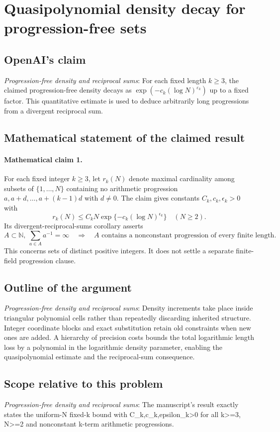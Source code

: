 \documentclass[11pt]{article}
\begin{document}
\section*{Quasipolynomial density decay for progression-free sets}

\subsection{OpenAI's claim}
\textit{Progression-free density and reciprocal sums}: For each fixed length $k\ge3$, the claimed progression-free density decays as $\exp(-c_k(\log N)^{\varepsilon_k})$ up to a fixed factor. This quantitative estimate is used to deduce arbitrarily long progressions from a divergent reciprocal sum.

\subsection{Mathematical statement of the claimed result}
\paragraph{Mathematical claim 1.} For each fixed integer $k\ge3$, let $r_k(N)$ denote maximal cardinality among subsets of $\{1,\ldots,N\}$ containing no arithmetic progression $a,a+d,\ldots,a+(k-1)d$ with $d\ne0$. The claim gives constants $C_k,c_k,\epsilon_k>0$ with \[r_k(N)\le C_kN\exp\{-c_k(\log N)^{\epsilon_k}\}\quad(N\ge2).\] Its divergent-reciprocal-sums corollary asserts \[A\subset\mathbb N,\ \sum_{a\in A}a^{-1}=\infty\quad\Longrightarrow\quad A\text{ contains a nonconstant progression of every finite length}.\] This concerns sets of distinct positive integers. It does not settle a separate finite-field progression clause.

\subsection{Outline of the argument}
\textit{Progression-free density and reciprocal sums}: Density increments take place inside triangular polynomial cells rather than repeatedly discarding inherited structure. Integer coordinate blocks and exact substitution retain old constraints when new ones are added. A hierarchy of precision costs bounds the total logarithmic length loss by a polynomial in the logarithmic density parameter, enabling the quasipolynomial estimate and the reciprocal-sum consequence.

\subsection{Scope relative to this problem}
\textit{Progression-free density and reciprocal sums}: The manuscript’s result exactly states the uniform-N fixed-k bound with C\_k,c\_k,epsilon\_k>0 for all k>=3, N>=2 and nonconstant k-term arithmetic progressions.
\end{document}
